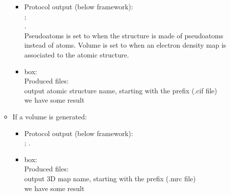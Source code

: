\begin{itemize}
\begin{itemize}
                                \begin{itemize}
                                \item Protocol output (below \scipion framework):\\
                                        ;\\ .\\Pseudoatoms is set to  when the structure is made of pseudoatoms instead of atoms. Volume is set to  when an electron density map is associated to the atomic structure.
                                \item {} box:\\Produced files:\\output atomic structure name, starting with the prefix (.cif file)\\we have some result
                                \end{itemize}
                    \item If a volume is generated:
                    
                                \begin{itemize}
                                \item Protocol output (below \scipion framework):\\
                                        ; .\\
                                \item {} box:\\Produced files:\\output 3D map name, starting with the prefix (.mrc file)\\we have some result
                                \end{itemize}
                    
                \end{itemize}
  
 \end{itemize}


